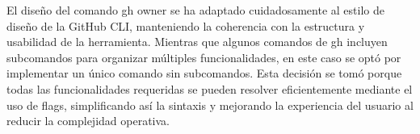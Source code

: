 El diseño del comando gh owner se ha adaptado cuidadosamente al estilo de diseño de la GitHub CLI, manteniendo la coherencia con la estructura y usabilidad de la herramienta. Mientras que algunos comandos de gh incluyen subcomandos para organizar múltiples funcionalidades, en este caso se optó por implementar un único comando sin subcomandos. Esta decisión se tomó porque todas las funcionalidades requeridas se pueden resolver eficientemente mediante el uso de flags, simplificando así la sintaxis y mejorando la experiencia del usuario al reducir la complejidad operativa.